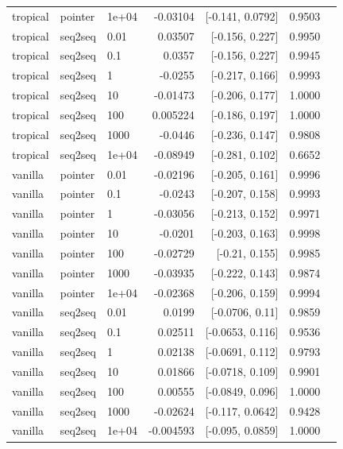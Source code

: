 \documentclass[10pt]{article}
\begin{document}
{\begin{longtable}{lllrrrl}
tropical & pointer & 1e+04 & -0.03104 & [-0.141, 0.0792] & 0.9503 & \\
tropical & seq2seq & 0.01 & 0.03507 & [-0.156, 0.227] & 0.9950 & \\
tropical & seq2seq & 0.1 & 0.0357 & [-0.156, 0.227] & 0.9945 & \\
tropical & seq2seq & 1 & -0.0255 & [-0.217, 0.166] & 0.9993 & \\
tropical & seq2seq & 10 & -0.01473 & [-0.206, 0.177] & 1.0000 & \\
tropical & seq2seq & 100 & 0.005224 & [-0.186, 0.197] & 1.0000 & \\
tropical & seq2seq & 1000 & -0.0446 & [-0.236, 0.147] & 0.9808 & \\
tropical & seq2seq & 1e+04 & -0.08949 & [-0.281, 0.102] & 0.6652 & \\
vanilla & pointer & 0.01 & -0.02196 & [-0.205, 0.161] & 0.9996 & \\
vanilla & pointer & 0.1 & -0.0243 & [-0.207, 0.158] & 0.9993 & \\
vanilla & pointer & 1 & -0.03056 & [-0.213, 0.152] & 0.9971 & \\
vanilla & pointer & 10 & -0.0201 & [-0.203, 0.163] & 0.9998 & \\
vanilla & pointer & 100 & -0.02729 & [-0.21, 0.155] & 0.9985 & \\
vanilla & pointer & 1000 & -0.03935 & [-0.222, 0.143] & 0.9874 & \\
vanilla & pointer & 1e+04 & -0.02368 & [-0.206, 0.159] & 0.9994 & \\
vanilla & seq2seq & 0.01 & 0.0199 & [-0.0706, 0.11] & 0.9859 & \\
vanilla & seq2seq & 0.1 & 0.02511 & [-0.0653, 0.116] & 0.9536 & \\
vanilla & seq2seq & 1 & 0.02138 & [-0.0691, 0.112] & 0.9793 & \\
vanilla & seq2seq & 10 & 0.01866 & [-0.0718, 0.109] & 0.9901 & \\
vanilla & seq2seq & 100 & 0.00555 & [-0.0849, 0.096] & 1.0000 & \\
vanilla & seq2seq & 1000 & -0.02624 & [-0.117, 0.0642] & 0.9428 & \\
vanilla & seq2seq & 1e+04 & -0.004593 & [-0.095, 0.0859] & 1.0000 & \\
\bottomrule
\end{longtable}
}
\end{document}
